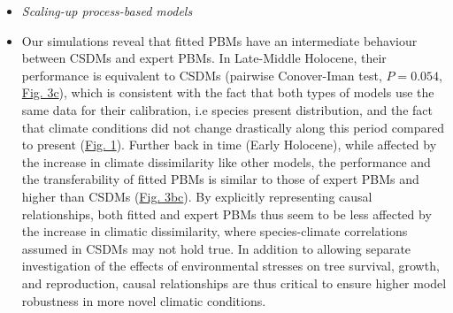 \documentclass[pdflatex, sn-nature]{sn-jnl}%
\begin{document}
\begin{itemize}
\item \emph{Scaling-up process-based models}\par
\item Our simulations reveal that fitted PBMs have an intermediate behaviour between CSDMs and expert PBMs. In Late-Middle Holocene, their performance is equivalent to CSDMs (pairwise Conover-Iman test, $P=0.054$, \hyperref[past_performance]{Fig. 3c}), which is consistent with the fact that both types of models use the same data for their calibration, i.e species present distribution, and the fact that climate conditions did not change drastically along this period compared to present (\hyperref[climatic_dissimilarity]{Fig. 1}). Further back in time (Early Holocene), while affected by the increase in climate dissimilarity like other models, the performance and the transferability of fitted PBMs is similar to those of expert PBMs and higher than CSDMs (\hyperref[past_performance]{Fig. 3bc}). By explicitly representing causal relationships, both fitted and expert PBMs thus seem to be less affected by the increase in climatic dissimilarity, where species-climate correlations assumed in CSDMs may not hold true.  In addition to allowing separate investigation of the effects of environmental stresses on tree survival, growth, and reproduction, causal relationships are thus critical to ensure higher model robustness in more novel climatic conditions. 

\end{itemize}
\end{document}
